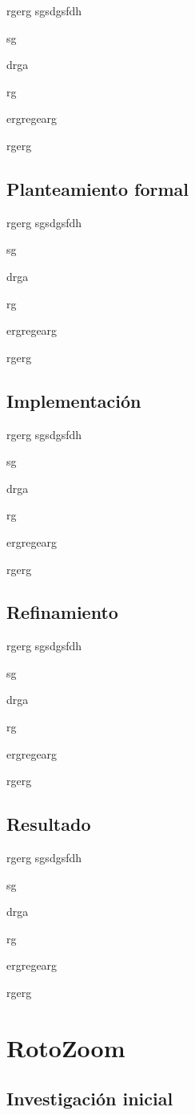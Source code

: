 rgerg
sgsdgsfdh

sg

drga

rg

ergregearg

rgerg

\subsection{Planteamiento formal}

rgerg
sgsdgsfdh

sg

drga

rg

ergregearg

rgerg

\subsection{Implementación}

rgerg
sgsdgsfdh

sg

drga

rg

ergregearg

rgerg

\subsection{Refinamiento}

rgerg
sgsdgsfdh

sg

drga

rg

ergregearg

rgerg

\subsection{Resultado}

rgerg
sgsdgsfdh

sg

drga

rg

ergregearg

rgerg


\section{RotoZoom}

\subsection{Investigación inicial}

